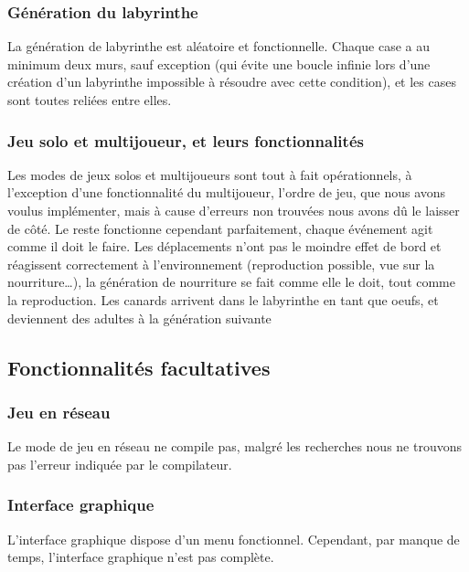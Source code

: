 \documentclass[12pt,a4paper,twoside]{article}
\begin{document}
\subsubsection{Génération du labyrinthe}
    La génération de labyrinthe est aléatoire et fonctionnelle. Chaque case a au minimum deux murs, sauf exception (qui évite une boucle infinie lors d’une création d’un labyrinthe impossible à résoudre avec cette condition), et les cases sont toutes reliées entre elles. 
\subsubsection{Jeu solo et multijoueur, et leurs fonctionnalités }
    Les modes de jeux solos et multijoueurs sont tout à fait opérationnels, à l’exception d’une fonctionnalité du multijoueur, l’ordre de jeu, que nous avons voulus implémenter, mais à cause d’erreurs non trouvées nous avons dû le laisser de côté. Le reste fonctionne cependant parfaitement, chaque événement agit comme il doit le faire. Les déplacements n’ont pas le moindre effet de bord et réagissent correctement à l'environnement (reproduction possible, vue sur la nourriture…), la génération de nourriture se fait comme elle le doit, tout comme la reproduction. Les canards arrivent dans le labyrinthe en tant que oeufs, et deviennent des adultes à la génération suivante
\subsection{Fonctionnalités facultatives}
\subsubsection{Jeu en réseau}
    Le mode de jeu en réseau ne compile pas, malgré les recherches nous ne trouvons pas l’erreur indiquée par le compilateur.
\subsubsection{Interface graphique}
    L’interface graphique dispose d’un menu fonctionnel. Cependant, par manque de temps, l’interface graphique n’est pas complète.
\end{document}

